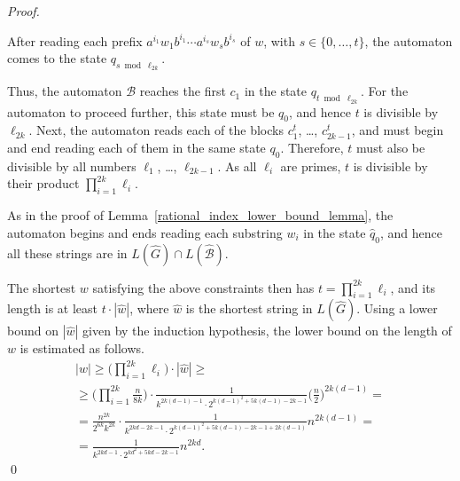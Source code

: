 \documentclass[runningheads]{llncs}
\begin{document}
\begin{proof}
\begin{claim}
After reading each prefix $a^{i_1} w_1 b^{i_1} \cdots a^{i_s} w_s b^{i_s}$ of $w$,
with $s \in \{0, \ldots, t\}$,
the automaton comes to the state $q_{s \bmod \ell_{2k}}$.
\end{claim}

Thus, the automaton $\mathcal{B}$ reaches the first $c_1$ in the state $q_{t \bmod \ell_{2k}}$.
For the automaton to proceed further, this state must be $q_0$,
and hence $t$ is divisible by $\ell_{2k}$.
Next, the automaton reads each of the blocks $c_1^t$, \ldots, $c_{2k-1}^t$,
and must begin and end reading each of them in the same state $q_0$.
Therefore, $t$ must also be divisible by all numbers $\ell_1$, \ldots, $\ell_{2k-1}$.
As all $\ell_i$ are primes,
$t$ is divisible by their product $\prod\limits_{i=1}^{2k}\ell_i$.

As in the proof of Lemma~\ref{rational_index_lower_bound_lemma},
the automaton begins and ends reading each substring $w_i$
in the state $\widehat{q}_0$,
and hence all these strings are in $L(\widehat{G}) \cap L(\widehat{\mathcal{B}})$.

The shortest $w$ satisfying the above constraints
then has $t=\prod\limits_{i=1}^{2k}\ell_i$,
and its length is at least $t \cdot |\widehat{w}|$,
where $\widehat{w}$ is the shortest string in $L(\widehat{G})$.
Using a lower bound on $|\widehat{w}|$ given by the induction hypothesis,
the lower bound on the length of $w$ is estimated as follows.
\begin{multline*}
	|w|
		\geqslant
	\bigg(\prod\limits_{i=1}^{2k}\ell_i\bigg) \cdot |\widehat{w}|
		\geqslant \\ \geqslant
	\bigg(\prod\limits_{i=1}^{2k}\frac{n}{8k}\bigg) \cdot
	\frac{1}{k^{2k(d-1)-1} \cdot 2^{k(d-1)^2 + 5k(d-1) -2k -1}} \Big(\frac{n}{2}\Big)^{2k(d-1)}
		= \\ = %
	\frac{n^{2k}}{2^{6k}k^{2k}} \cdot 
	\frac{1}{k^{2kd-2k-1} \cdot 2^{k(d-1)^2 + 5k(d-1) -2k -1 + 2k(d-1)}} n^{2k(d-1)}
	= \\	= %
	\frac{1}{k^{2kd-1} \cdot 2^{kd^2 + 5kd -2k -1}} n^{2kd}.
\end{multline*}
\qed
\end{proof}
\end{document}
